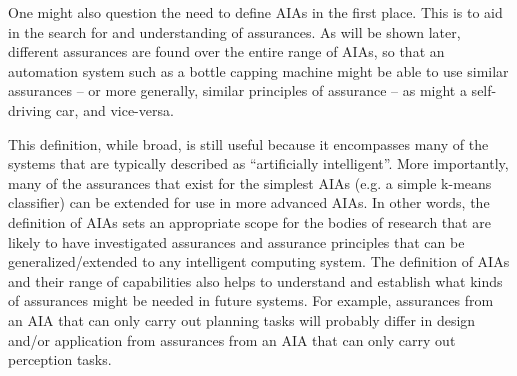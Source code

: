     One might also question the need to define AIAs in the first place. This is to aid in the search for and understanding of assurances. As will be shown later, different assurances are found over the entire range of AIAs, so that an automation system such as a bottle capping machine might be able to use similar assurances -- or more generally, similar principles of assurance -- as might a self-driving car, and vice-versa.

    This definition, while broad, is still useful because it encompasses many of the systems that are typically described as ``artificially intelligent''. More importantly, many of the assurances that exist for the simplest AIAs (e.g. a simple k-means classifier) can be extended for use in more advanced AIAs. In other words, the definition of AIAs sets an appropriate scope for the bodies of research that are likely to have investigated assurances and assurance principles that can be generalized/extended to any intelligent computing system. The definition of AIAs and their range of capabilities also helps to understand and establish what kinds of assurances might be needed in future systems. For example, assurances from an AIA that can only carry out planning tasks will probably differ in design and/or application from assurances from an AIA that can only carry out perception tasks. 
